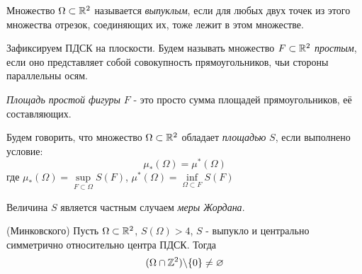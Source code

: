 \begin{definition}
	Множество $\Omega \subset \mathbb{R}^2$ называется \textit{выпуклым}, если для любых двух точек из этого множества отрезок, соединяющих их, тоже лежит в этом множестве.
\end{definition}

\begin{definition}
	Зафиксируем ПДСК на плоскости. Будем называть множество $F \subset \mathbb{R}^2$ \textit{простым}, если оно представляет собой совокупность прямоугольников, чьи стороны параллельны осям.
\end{definition}

\begin{definition}
	\textit{Площадь простой фигуры} $F$ - это просто сумма площадей прямоугольников, её составляющих. 
\end{definition}

\begin{definition}
	Будем говорить, что множество $\Omega \subset \mathbb{R}^2$ обладает \textit{площадью} $S$, если выполнено условие:
	\[
		\mu_*(\Omega) = \mu^*(\Omega)
	\]
	где $\mu_*(\Omega) = \sup\limits_{F \subset \Omega} S(F)$, $\mu^*(\Omega) = \inf\limits_{\Omega \subset F} S(F)$
\end{definition}

\begin{note}
	Величина $S$ является частным случаем \textit{меры Жордана}.
\end{note}

\begin{theorem} (Минковского)
	Пусть $\Omega \subset \mathbb{R}^2$, $S(\Omega) > 4$, $S$ - выпукло и центрально симметрично относительно центра ПДСК. Тогда
	\[
		(\Omega \cap \mathbb{Z}^2) \backslash \{0\} \neq \varnothing
 	\]
\end{theorem}